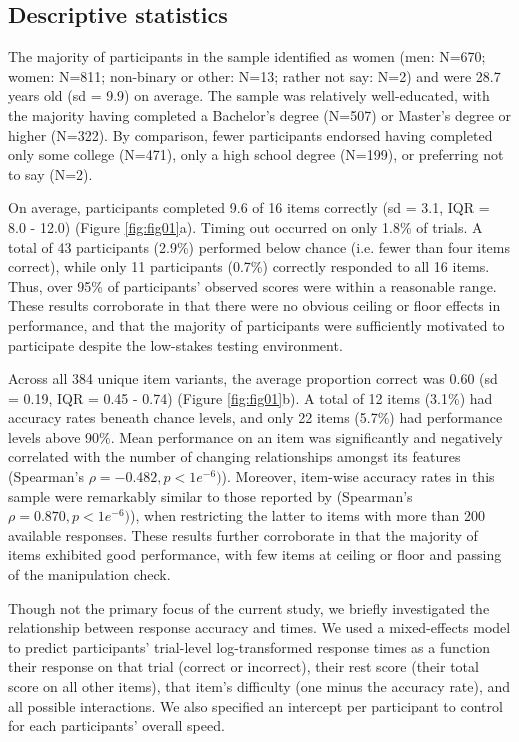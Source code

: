 \documentclass[a4paper,man,natbib]{apa6}
\begin{document}
\subsection{Descriptive statistics}

The majority of participants in the sample identified as women (men: N=670; women: N=811; non-binary or other: N=13; rather not say: N=2) and were 28.7 years old (sd = 9.9) on average. The sample was relatively well-educated, with the majority having completed a Bachelor's degree (N=507) or Master's degree or higher (N=322). By comparison, fewer participants endorsed having completed only some college (N=471), only a high school degree (N=199), or preferring not to say (N=2). 

On average, participants completed 9.6 of 16 items correctly (sd = 3.1, IQR = 8.0 - 12.0) (Figure \ref{fig:fig01}a). Timing out occurred on only 1.8\% of trials. A total of 43 participants (2.9\%) performed below chance (i.e. fewer than four items correct), while only 11 participants (0.7\%) correctly responded to all 16 items. Thus, over 95\% of participants' observed scores were within a reasonable range. These results corroborate \cite{chierchia2019matrix} in that there were no obvious ceiling or floor effects in performance, and that the majority of participants were sufficiently motivated to participate despite the low-stakes testing environment.  

Across all 384 unique item variants, the average proportion correct was 0.60 (sd = 0.19, IQR = 0.45 - 0.74) (Figure \ref{fig:fig01}b). A total of 12 items (3.1\%) had accuracy rates beneath chance levels, and only 22 items (5.7\%) had performance levels above 90\%. Mean performance on an item was significantly and negatively correlated with the number of changing relationships amongst its features (Spearman's $\rho = -0.482, p < 1e^{-6})$). Moreover, item-wise accuracy rates in this sample were remarkably similar to those reported by \cite{chierchia2019matrix} (Spearman's $\rho = 0.870, p < 1e^{-6})$), when restricting the latter to items with more than 200 available responses. These results further corroborate \cite{chierchia2019matrix} in that the majority of items exhibited good performance, with few items at ceiling or floor and passing of the manipulation check. 

Though not the primary focus of the current study, we briefly investigated the relationship between response accuracy and times. We used a mixed-effects model to predict participants' trial-level log-transformed response times as a function their response on that trial (correct or incorrect), their rest score (their total score on all other items), that item's difficulty (one minus the accuracy rate), and all possible interactions. We also specified an intercept per participant to control for each participants' overall speed. 
\end{document}
